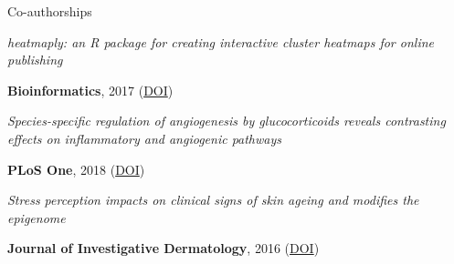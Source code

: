 \begin{cventries}
\cventry
{Co-authorships} %
{} %
{} %
{} %
{ %
    \begin{cvitems}
        \item {
            \begin{flushleft}
                \textit{
                    heatmaply: an R package for creating interactive cluster 
                    heatmaps for online publishing
                }
            \end{flushleft}
            \textbf{Bioinformatics}, 2017
            (\href{https://doi.org/10.1093/bioinformatics/btx657}{DOI})
        }
        \item {
            \begin{flushleft}
                \textit{
                    Species-specific regulation of angiogenesis by 
                    glucocorticoids reveals contrasting effects on inflammatory 
                    and angiogenic pathways
                    } 
            \end{flushleft}
            \textbf{PLoS One}, 2018  
            (\href{https://doi.org/10.1371/journal.pone.0192746}{DOI})
        }
        \item {
            \begin{flushleft}
                \textit{
                    Stress perception impacts on clinical signs of skin ageing 
                    and modifies the epigenome
                }
            \end{flushleft}
            \textbf{Journal of Investigative Dermatology}, 2016
            (\href{http://dx.doi.org/10.1016/j.jid.2016.06.079}{DOI})
        }
    \end{cvitems}
}


\end{cventries}
